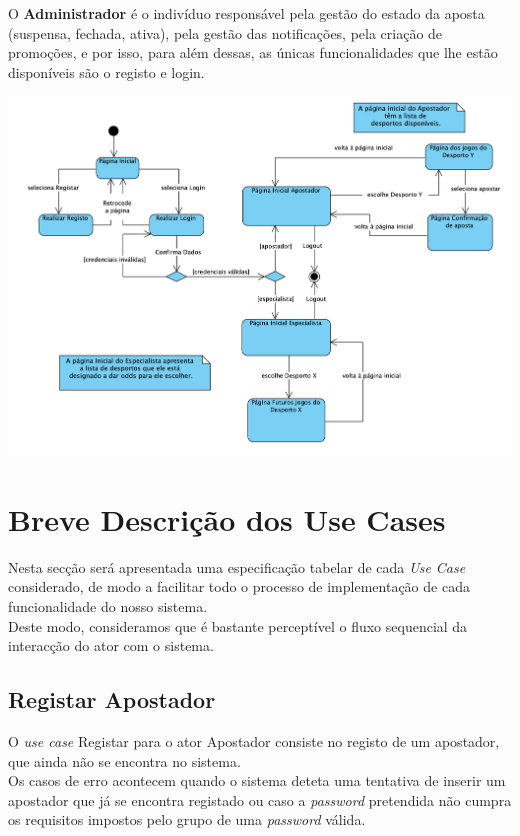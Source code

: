 O \textbf{Administrador} é o indivíduo responsável pela gestão do estado da aposta (suspensa, fechada, ativa), pela gestão das notificações, pela criação de promoções, e por isso, para além dessas, as únicas funcionalidades que lhe estão disponíveis são o registo e login.

\includegraphics[width=1\textwidth]{imagens/ambitoProduto/maqEstados.png}


\section{Breve Descrição dos Use Cases}
Nesta secção será apresentada uma especificação tabelar de cada \textit{Use Case} considerado, de modo a facilitar todo o processo de implementação de cada funcionalidade do nosso sistema.\\
Deste modo, consideramos que é bastante perceptível o fluxo sequencial da interacção do ator com o sistema.

\subsection{Registar Apostador}
O \textit{use case} Registar para o ator Apostador consiste no registo de um apostador, que ainda não se encontra no sistema.\\
Os casos de erro acontecem quando o sistema deteta uma tentativa de inserir um apostador que já se encontra registado ou caso a \textit{password} pretendida não cumpra os requisitos impostos pelo grupo de uma \textit{password} válida.


